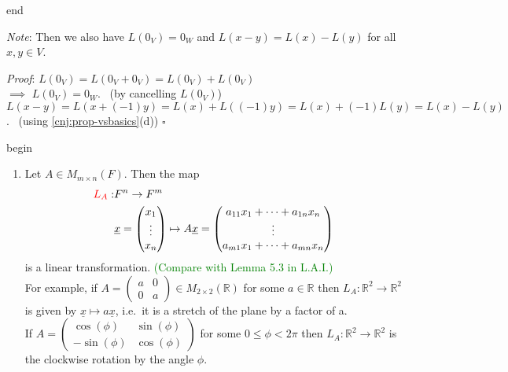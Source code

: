 \documentclass[
  12pt,
  a4paper,
  twoside]{article}
\theoremstyle{plain}
\theoremstyle{definition}
\begin{document}
\csname end

\emph{Note}: Then we also have \(L( 0_{V}) = 0_{W}\) and \(L(x-y) = L(x) - L(y)\) for all \(x,y \in V\).

\emph{Proof}: \(L(0_{V}) = L(0_{V} + 0_{V}) = L(0_{V}) + L(0_{V})\)\\
\(\implies\) \(L(0_{V}) = 0_{W}\). \hfill~{(by cancelling \(L(0_{V})\))}\\
\(L(x-y) = L(x+(-1)y) = L(x) + L((-1)y) = L(x) + (-1)L(y) = L(x) - L(y)\).
\hfill~{(using \ref{cnj:prop-vsbasics}(d)) \(\square\)}

\csname begin\label{cnj:expl-lt}

\begin{enumerate}
\def\labelenumi{(\alph{enumi})}
\item
  Let \(A \in M_{m \times n}(F)\). Then the map
  \begin{align*} {\color{red}{L_{A}}}: &F^{n} \to F^{m} \\
  &\underline{x} = \begin{pmatrix} x_{1} \\ \vdots \\ x_{n} \end{pmatrix} \mapsto
  A \underline{x} = \begin{pmatrix} a_{11}x_{1} + \dots + a_{1n}x_{n} \\ \vdots \\ a_{m1}x_{1} + \dots + a_{mn}x_{n} \end{pmatrix}
  \end{align*}
  is a linear transformation. \textcolor{green}{(Compare with Lemma 5.3 in L.A.I.)}\\
  For example, if \(A = \begin{pmatrix} a & 0 \\ 0 & a \end{pmatrix} \in M_{2 \times 2}(\mathbb{R})\) for some \(a \in \mathbb{R}\) then \(L_{A} : \mathbb{R}^{2} \to \mathbb{R}^{2}\) is given by \(\underline{x} \mapsto a \underline{x}\), i.e.~it is a stretch of the plane by a factor of a.\\
  If \(A = \begin{pmatrix} \cos(\phi) & \sin(\phi) \\ -\sin(\phi) & \cos(\phi) \end{pmatrix}\) for some \(0 \leq \phi < 2\pi\) then \(L_{A}: \mathbb{R}^{2} \to \mathbb{R}^{2}\) is the clockwise rotation by the angle \(\phi\).\\
  \hspace*{0.333em}\\

\end{enumerate}
\end{document}

